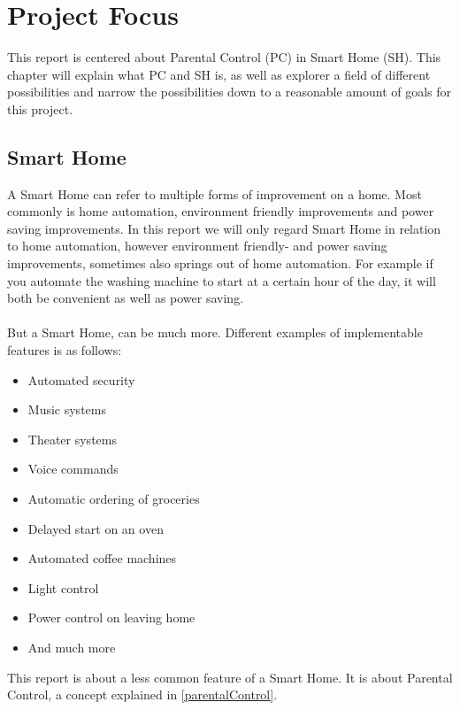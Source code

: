 \chapter{Project Focus}
This report is centered about Parental Control (PC) in Smart Home (SH). This chapter will explain what PC and SH is, as well as explorer a field of different possibilities and narrow the possibilities down to a reasonable amount of goals for this project.

\section{Smart Home}
A Smart Home can refer to multiple forms of improvement on a home. Most commonly is home automation, environment friendly improvements and power saving improvements. In this report we will only regard Smart Home in relation to home automation, however environment friendly- and power saving improvements, sometimes also springs out of home automation. For example if you automate the washing machine to start at a certain hour of the day, it will both be convenient as well as power saving.\\
\\
But a Smart Home, can be much more. Different examples of implementable features is as follows:

\begin{itemize}
	\item Automated security
	\item Music systems
	\item Theater systems
	\item Voice commands
	\item Automatic ordering of groceries
	\item Delayed start on an oven
	\item Automated coffee machines
	\item Light control
	\item Power control on leaving home
	\item And much more
\end{itemize}

This report is about a less common feature of a Smart Home. It is about Parental Control, a concept explained in \ref{parentalControl}.

